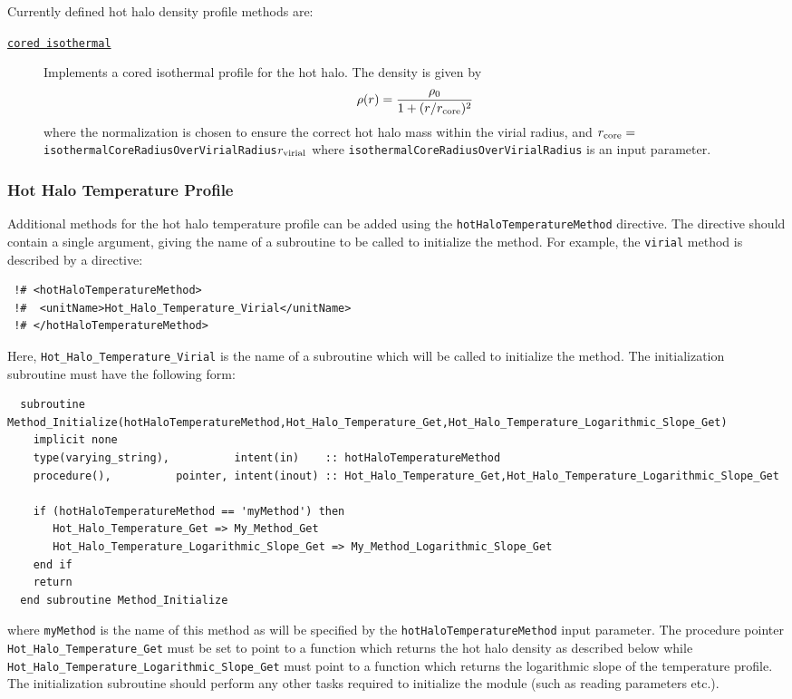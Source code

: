 Currently defined hot halo density profile methods are:
\begin{description}
 \item [\hyperlink{hot_halo.density_profile.cored_isothermal.F90:hot_halo_density_profile_cored_isothermal:hot_halo_density_cored_isothermal_get}{{\tt cored isothermal}}] Implements a cored isothermal profile for the hot halo. The density is given by
 \begin{equation}
  \rho(r) = {\rho_0 \over 1 + (r/r_{\rm core})^2}
 \end{equation}
 where the normalization is chosen to ensure the correct hot halo mass within the virial radius, and $r_{\rm core}=${\tt isothermalCoreRadiusOverVirialRadius}$r_{\rm virial}$ where {\tt isothermalCoreRadiusOverVirialRadius} is an input parameter.
\end{description}

\subsubsection{Hot Halo Temperature Profile}

Additional methods for the hot halo temperature profile can be added using the {\tt hotHaloTemperatureMethod} directive. The directive should contain a single argument, giving the name of a subroutine to be called to initialize the method. For example, the {\tt virial} method is described by a directive:
\begin{verbatim}
 !# <hotHaloTemperatureMethod>
 !#  <unitName>Hot_Halo_Temperature_Virial</unitName>
 !# </hotHaloTemperatureMethod>
\end{verbatim}
Here, {\tt Hot\_Halo\_Temperature\_Virial} is the name of a subroutine which will be called to initialize the method. The initialization subroutine must have the following form:
\begin{verbatim}
  subroutine Method_Initialize(hotHaloTemperatureMethod,Hot_Halo_Temperature_Get,Hot_Halo_Temperature_Logarithmic_Slope_Get)
    implicit none
    type(varying_string),          intent(in)    :: hotHaloTemperatureMethod
    procedure(),          pointer, intent(inout) :: Hot_Halo_Temperature_Get,Hot_Halo_Temperature_Logarithmic_Slope_Get
    
    if (hotHaloTemperatureMethod == 'myMethod') then
       Hot_Halo_Temperature_Get => My_Method_Get
       Hot_Halo_Temperature_Logarithmic_Slope_Get => My_Method_Logarithmic_Slope_Get
    end if
    return
  end subroutine Method_Initialize
\end{verbatim}
where {\tt myMethod} is the name of this method as will be specified by the {\tt hotHaloTemperatureMethod} input parameter. The procedure pointer {\tt Hot\_Halo\_Temperature\_Get} must be set to point to a function which returns the hot halo density as described below while {\tt Hot\_Halo\_Temperature\_Logarithmic\_Slope\_Get} must point to a function which returns the logarithmic slope of the temperature profile. The initialization subroutine should perform any other tasks required to initialize the module (such as reading parameters etc.).


